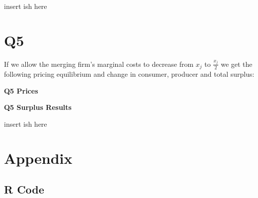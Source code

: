 \documentclass{article}
\newcommand{\1}{\mathbbm{1}}
\begin{document}
\color{red}
insert ish here
\color{black}

\section{Q5}
If we allow the merging firm's marginal costs to decrease from $x_j$ to $\frac{x_j}{2}$ we get the following pricing equilibrium and change in consumer, producer and total surplus:


\begin{center}
	\centering
	\textbf{Q5 Prices}\par\medskip
	\scalebox{1}{
		
	}
\end{center}

\begin{center}
	\centering
	\textbf{Q5 Surplus Results}\par\medskip
	\scalebox{1}{
		
	}
\end{center}


\color{red}
insert ish here
\color{black}





\section{Appendix}
\subsection{R Code}


\end{document}
